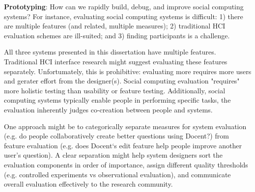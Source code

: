 
\textbf{Prototyping}: How can we rapidly build, debug, and improve social computing systems? For instance, evaluating social computing systems is difficult: 1) there are multiple features (and related, multiple measures); 2) traditional HCI evaluation schemes are ill-suited; and 3) finding participants is a challenge.

All three systems presented in this dissertation have multiple features. Traditional HCI interface research might suggest evaluating these features separately. Unfortumately, this is prohibitive: evaluating more requires more users and gerater effort from the designer(s). Social computing evaluation "requires" more holistic testing than usability or feature testing. Additionally, social computing systems typically enable people in performing specific tasks, the evaluation inherently judges co-creation between people and systems.

One approach might be to categorically separate measures for system evaluation (e.g. do people collaboratively create better questions using Docent?) from feature evaluation (e.g. does Docent‘s edit feature help people improve another user’s question). A clear separation might help system designers sort the evaluation components in order of importance, assign different quality thresholds (e.g. controlled experiments vs observational evaluation), and communicate overall evaluation effectively to the research community.




